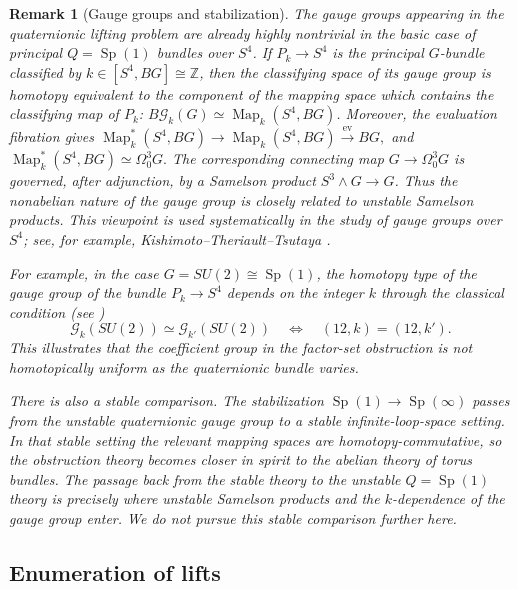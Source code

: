 \documentclass[11pt,a4paper]{article}
\numberwithin{equation}{section}
\newtheorem{remark}[definition]{Remark}
\theoremstyle{named}
\begin{document}
\begin{remark}[Gauge groups and stabilization]
\label{rem:gauge-groups-stabilization}
The gauge groups appearing in the quaternionic lifting problem are already highly nontrivial in the basic case of principal \(Q=\operatorname{Sp}(1)\) bundles over \(S^4\). If \(P_k\to S^4\) is the principal \(G\)-bundle classified by \(k\in [S^4,BG]\cong\mathbb Z\), then the classifying space of its gauge group is homotopy equivalent to the component of the mapping space which contains the classifying map of \(P_k\): \(B\mathcal G_k(G)\simeq \operatorname{Map}_k(S^4,BG)\). Moreover, the evaluation fibration gives \(\operatorname{Map}^*_k(S^4,BG) \longrightarrow\operatorname{Map}_k(S^4,BG)\xrightarrow{\mathrm{ev}} BG, \) and \(\operatorname{Map}^*_k(S^4,BG)\simeq \Omega^3_0G.\) The corresponding connecting map \(G\longrightarrow \Omega^3_0G\) is governed, after adjunction, by a Samelson product \(S^3\wedge G\longrightarrow G\). Thus the nonabelian nature of the gauge group is closely related to unstable Samelson products. This viewpoint is used systematically in the study of gauge groups over \(S^4\); see, for example, Kishimoto--Theriault--Tsutaya \cite{KishimotoTheriaultTsutayaG2}.

For example, in the case \(G=SU(2)\cong \operatorname{Sp}(1)\), the homotopy type of the gauge group of the bundle \(P_k\to S^4\) depends on the integer \(k\) through the classical condition (see \cite{Kono91})
\[
\mathcal G_k(SU(2))\simeq \mathcal G_{k'}(SU(2))
\quad\Longleftrightarrow\quad
(12,k)=(12,k').
\]
This illustrates that the coefficient group in the factor-set obstruction is not homotopically uniform as the quaternionic bundle varies.

There is also a stable comparison. The stabilization \(\operatorname{Sp}(1)\longrightarrow \operatorname{Sp}(\infty) \) passes from the unstable quaternionic gauge group to a stable infinite-loop-space setting. In that stable setting the relevant mapping spaces are homotopy-commutative, so the obstruction theory becomes closer in spirit to the abelian theory of torus bundles. The passage back from the stable theory to the unstable \(Q=\operatorname{Sp}(1)\) theory is precisely where unstable Samelson products and the \(k\)-dependence of the gauge group enter. We do not pursue this stable comparison further here.
\end{remark}

\subsection{Enumeration of lifts}
\end{document}
